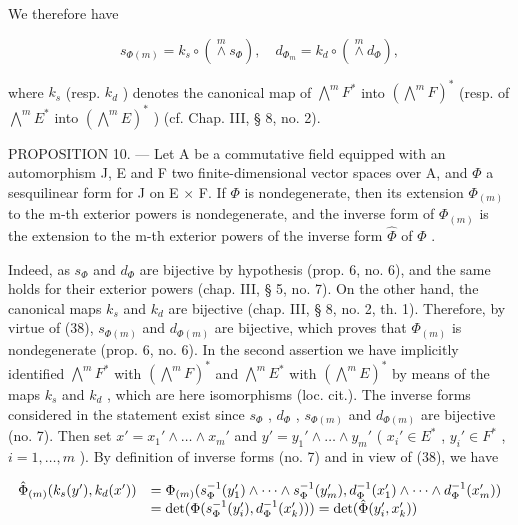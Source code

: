 We therefore have

\[
s _ {\Phi (m)} = k _ {s} \circ (\stackrel {m} {\wedge} s _ {\Phi}), \quad d _ {\Phi_ {m}} = k _ {d} \circ (\stackrel {m} {\wedge} d _ {\Phi}),\tag{38}
\]

where \(k_s\) (resp. \(k_d\) ) denotes the canonical map of \(\bigwedge^m F^*\) into \((\bigwedge^m F)^*\) (resp. of \(\bigwedge^m E^*\) into \((\bigwedge^m E)^*\) ) (cf. Chap. III, § 8, no. 2).

PROPOSITION 10. --- Let A be a commutative field equipped with an automorphism J, E and F two finite-dimensional vector spaces over A, and \(\Phi\) a sesquilinear form for J on E \(\times\) F. If \(\Phi\) is nondegenerate, then its extension \(\Phi_{(m)}\) to the m-th exterior powers is nondegenerate, and the inverse form of \(\Phi_{(m)}\) is the extension to the m-th exterior powers of the inverse form \(\hat{\Phi}\) of \(\Phi\) .

Indeed, as \(s_{\Phi}\) and \(d_{\Phi}\) are bijective by hypothesis (prop. 6, no. 6), and the same holds for their exterior powers (chap. III, § 5, no. 7). On the other hand, the canonical maps \(k_s\) and \(k_d\) are bijective (chap. III, § 8, no. 2, th. 1). Therefore, by virtue of (38), \(s_{\Phi(m)}\) and \(d_{\Phi(m)}\) are bijective, which proves that \(\Phi_{(m)}\) is nondegenerate (prop. 6, no. 6). In the second assertion we have implicitly identified \(\bigwedge^m F^*\) with \((\bigwedge^m F)^*\) and \(\bigwedge^m E^*\) with \((\bigwedge^m E)^*\) by means of the maps \(k_s\) and \(k_d\) , which are here isomorphisms (loc. cit.). The inverse forms considered in the statement exist since \(s_{\Phi}\) , \(d_{\Phi}\) , \(s_{\Phi(m)}\) and \(d_{\Phi(m)}\) are bijective (no. 7). Then set \(x' = x_1' \wedge \ldots \wedge x_m'\) and \(y' = y_1' \wedge \ldots \wedge y_m'\) ( \(x_i' \in E^*\) , \(y_i' \in F^*\) , \(i = 1, \ldots, m\) ). By definition of inverse forms (no. 7) and in view of (38), we have

\[
\begin{array}{r l} \hat {\Phi} _ {(m)} (k _ {s} (y ^ {\prime}), k _ {d} (x ^ {\prime})) & = \Phi_ {(m)} (s _ {\Phi} ^ {- 1} (y _ {1} ^ {\prime}) \wedge \dots \wedge s _ {\Phi} ^ {- 1} (y _ {m} ^ {\prime}), d _ {\Phi} ^ {- 1} (x _ {1} ^ {\prime}) \wedge \dots \wedge d _ {\Phi} ^ {- 1} (x _ {m} ^ {\prime})) \\ & = \det (\Phi (s _ {\Phi} ^ {- 1} (y _ {i} ^ {\prime}), d _ {\Phi} ^ {- 1} (x _ {k} ^ {\prime}))) = \det (\hat {\Phi} (y _ {i} ^ {\prime}, x _ {k} ^ {\prime})) \end{array}
\]


